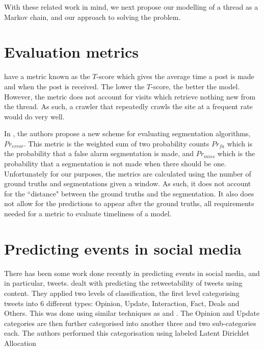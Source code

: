 
With these related work in mind, we next propose our modelling of a thread as a 
Markov chain, and our approach to solving the problem.


\section{Evaluation metrics}
 have a metric known as the $T$-score which gives the average 
time a post is made and when the post is received. The lower the $T$-score, the 
better the model. However, the metric does not account for visits which retrieve 
nothing new from the thread.  As such, a crawler that repeatedly crawls the site 
at a frequent rate would do very well.

In , the authors propose a new scheme for evaluating 
segmentation algorithms, $Pr_{error}$. This metric is the weighted sum of two 
probability counts $Pr_{fa}$ which is the probability that a false alarm 
segmentation is made, and $Pr_{miss}$ which is the probability that a 
segmentation is not made when there should be one. Unfortunately for our 
purposes, the metrics are calculated using the number of ground truths and 
segmentations given a window. As such, it does not account for the ``distance" 
between the ground truths and the segmentation. It also does not allow for the 
predictions to appear after the ground truths, all requirements needed for a 
metric to evaluate timeliness of a model.

\section{Predicting events in social media}
There has been some work done recently in predicting events in social media, and 
in particular, tweets. 
 dealt with predicting the retweetability of tweets using 
content. They applied two levels of classification, the first level categorising 
tweets into 6 different types: Opinion, Update, Interaction, Fact, Deals and 
Others. This was done using similar techniques as  and 
. The Opinion and Update categories are then further 
categorised into another three and two sub-categories each. The authors 
performed this categorisation using labeled Latent Dirichlet Allocation 

